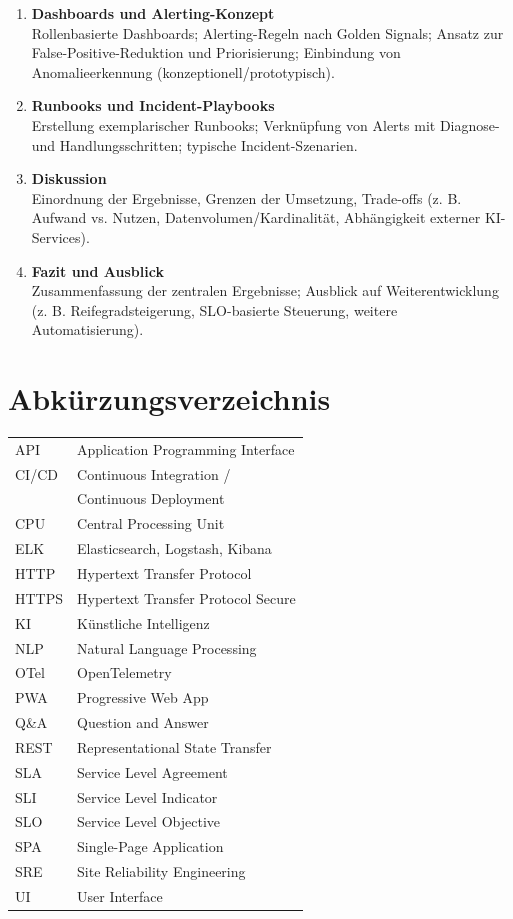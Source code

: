 \begin{enumerate}
  \item \textbf{Dashboards und Alerting-Konzept} \\
  Rollenbasierte Dashboards; Alerting-Regeln nach Golden Signals; Ansatz zur False-Positive-Reduktion und Priorisierung; Einbindung von Anomalieerkennung (konzeptionell/prototypisch).

  \item \textbf{Runbooks und Incident-Playbooks} \\
  Erstellung exemplarischer Runbooks; Verknüpfung von Alerts mit Diagnose- und Handlungsschritten; typische Incident-Szenarien.

  \item \textbf{Diskussion} \\
  Einordnung der Ergebnisse, Grenzen der Umsetzung, Trade-offs (z. B.  Aufwand vs. Nutzen, Datenvolumen/Kardinalität, Abhängigkeit externer KI-Services).

  \item \textbf{Fazit und Ausblick} \\
  Zusammenfassung der zentralen Ergebnisse; Ausblick auf Weiterentwicklung (z. B.  Reifegradsteigerung, SLO-basierte Steuerung, weitere Automatisierung).
\end{enumerate}



\section*{Abkürzungsverzeichnis}

\begin{tabular}{p{1.5cm} p{11cm}}
API        & Application Programming Interface \\
CI/CD      & Continuous Integration /\\
           & Continuous Deployment \\
CPU        & Central Processing Unit \\
ELK        & Elasticsearch, Logstash, Kibana \\
HTTP       & Hypertext Transfer Protocol \\
HTTPS     & Hypertext Transfer Protocol Secure \\
KI         & Künstliche Intelligenz \\
NLP        & Natural Language Processing \\
OTel      & OpenTelemetry \\
PWA       & Progressive Web App \\
Q\&A      & Question and Answer \\
REST      & Representational State Transfer \\
SLA       & Service Level Agreement \\
SLI       & Service Level Indicator \\
SLO       & Service Level Objective \\
SPA       & Single-Page Application \\
SRE       & Site Reliability Engineering \\
UI        & User Interface \\
\end{tabular}

